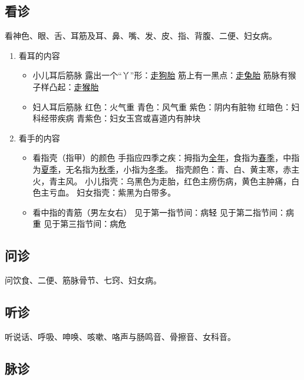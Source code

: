 \documentclass[cn,black,12pt,normal,founder]{elegantnote}
\newcommand{\redt}[1]{\textcolor{black}{{}#1}}      %
\begin{document}

\subsection{看诊}

看神色、眼、舌、耳筋及耳、鼻、嘴、发、皮、指、背腹、二便、妇女病。

\begin{enumerate}
  \item 看耳的内容
  \begin{itemize}
    \item 小儿耳后筋脉
    \subitem 露出一个“丫”形：\uline{走\redt{狗}胎}
    \subitem 筋上有一黑点：\uline{走\redt{兔}胎}
    \subitem 筋脉有猴子样凸起：\uline{走\redt{猴}胎}
    \item 妇人耳后筋脉
    \subitem 红色：火气重
    \subitem 青色：风气重
    \subitem 紫色：阴内有脏物
    \subitem 红暗色：妇科经带疾病
    \subitem 青紫色：妇女玉宫或喜道内有肿块
  \end{itemize}
  \item 看手的内容
  \begin{itemize}
    \item 看指壳（指甲）的颜色
    \subitem 手指应四季之疾：拇指为\uline{全年}，食指为\uline{春季}，中指为\uline{夏季}，无名指为\uline{秋季}，小指为\uline{冬季}。
    \subitem 指壳颜色：青、白、黄主寒，赤主火，青主风。
    \subitem 小儿指壳：乌黑色为走胎，红色主痨伤病，黄色主肿痛，白色主亏血。
    \subitem 妇女指壳：紫黑为白带多。
    \item 看中指的青筋（男左女右）
    \subitem 见于第\redt{一}指节间：病\redt{轻}
    \subitem 见于第\redt{二}指节间：病\redt{重}
    \subitem 见于第\redt{三}指节间：病\redt{危}
  \end{itemize}
\end{enumerate}

\subsection{问诊}

问饮食、二便、筋脉骨节、七窍、妇女病。

\subsection{听诊}

听说话、呼吸、呻唤、咳嗽、咯声与肠鸣音、骨擦音、女科音。

\subsection{脉诊}
\end{document}
